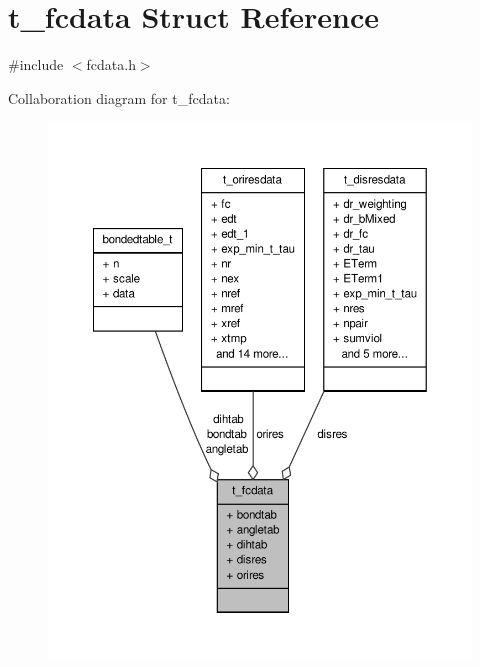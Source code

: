 \hypertarget{structt__fcdata}{\section{t\-\_\-fcdata \-Struct \-Reference}
\label{structt__fcdata}
}


{\ttfamily \#include $<$fcdata.\-h$>$}



\-Collaboration diagram for t\-\_\-fcdata\-:
\nopagebreak
\begin{figure}[H]
\begin{center}
\leavevmode
\includegraphics[width=350pt]{structt__fcdata__coll__graph}
\end{center}
\end{figure}
